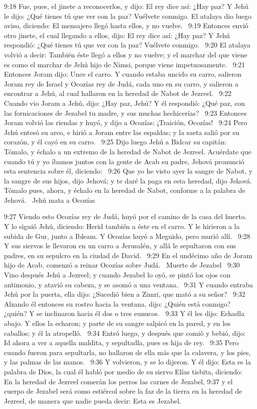 9:18 Fue, pues, el jinete a reconocerlos, y dijo: El rey dice así: ¿Hay paz? Y Jehú le dijo: ¿Qué tienes tú que ver con la paz? Vuélvete conmigo. El atalaya dio luego aviso, diciendo: El mensajero llegó hasta ellos, y no vuelve.  
9:19 Entonces envió otro jinete, el cual llegando a ellos, dijo: El rey dice así: ¿Hay paz? Y Jehú respondió: ¿Qué tienes tú que ver con la paz? Vuélvete conmigo.  
9:20 El atalaya volvió a decir: También éste llegó a ellos y no vuelve; y el marchar del que viene es como el marchar de Jehú hijo de Nimsi, porque viene impetuosamente.  
9:21 Entonces Joram dijo: Unce el carro. Y cuando estaba uncido su carro, salieron Joram rey de Israel y Ocozías rey de Judá, cada uno en su carro, y salieron a encontrar a Jehú, al cual hallaron en la heredad de Nabot de Jezreel.  
9:22 Cuando vio Joram a Jehú, dijo: ¿Hay paz, Jehú? Y él respondió: ¿Qué paz, con las fornicaciones de Jezabel tu madre, y sus muchas hechicerías?  
9:23 Entonces Joram volvió las riendas y huyó, y dijo a Ocozías: ¡Traición, Ocozías!  
9:24 Pero Jehú entesó su arco, e hirió a Joram entre las espaldas; y la saeta salió por su corazón, y él cayó en su carro.  
9:25 Dijo luego Jehú a Bidcar su capitán: Tómalo, y échalo a un extremo de la heredad de Nabot de Jezreel. Acuérdate que cuando tú y yo íbamos juntos con la gente de Acab su padre, Jehová pronunció esta sentencia sobre él, diciendo:  
9:26 Que yo he visto ayer la sangre de Nabot, y la sangre de sus hijos, dijo Jehová; y te daré la paga en esta heredad, dijo Jehová. Tómalo pues, ahora, y échalo en la heredad de Nabot, conforme a la palabra de Jehová.  
Jehú mata a Ocozías 

9:27 Viendo esto Ocozías rey de Judá, huyó por el camino de la casa del huerto. Y lo siguió Jehú, diciendo: Herid también a éste en el carro. Y le hirieron a la subida de Gur, junto a Ibleam. Y Ocozías huyó a Meguido, pero murió allí.  
9:28 Y sus siervos le llevaron en un carro a Jerusalén, y allá le sepultaron con sus padres, en su sepulcro en la ciudad de David.  
9:29 En el undécimo año de Joram hijo de Acab, comenzó a reinar Ocozías sobre Judá.  
Muerte de Jezabel  
9:30 Vino después Jehú a Jezreel; y cuando Jezabel lo oyó, se pintó los ojos con antimonio, y atavió su cabeza, y se asomó a una ventana.  
9:31 Y cuando entraba Jehú por la puerta, ella dijo: ¿Sucedió bien a Zimri, que mató a su señor?  
9:32 Alzando él entonces su rostro hacia la ventana, dijo: ¿Quién está conmigo? ¿quién? Y se inclinaron hacia él dos o tres eunucos.  
9:33 Y él les dijo: Echadla abajo. Y ellos la echaron; y parte de su sangre salpicó en la pared, y en los caballos; y él la atropelló.  
9:34 Entró luego, y después que comió y bebió, dijo: Id ahora a ver a aquella maldita, y sepultadla, pues es hija de rey.  
9:35 Pero cuando fueron para sepultarla, no hallaron de ella más que la calavera, y los pies, y las palmas de las manos.  
9:36 Y volvieron, y se lo dijeron. Y él dijo: Esta es la palabra de Dios, la cual él habló por medio de su siervo Elías tisbita, diciendo: En la heredad de Jezreel comerán los perros las carnes de Jezabel, 
9:37 y el cuerpo de Jezabel será como estiércol sobre la faz de la tierra en la heredad de Jezreel, de manera que nadie pueda decir: Esta es Jezabel.  

